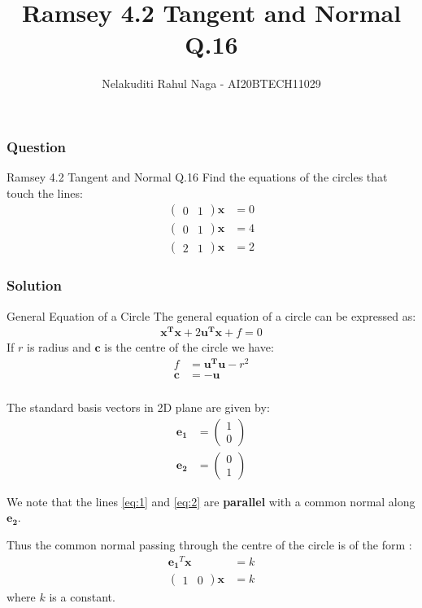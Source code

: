 \documentclass{beamer}
\title{Ramsey 4.2 Tangent and Normal Q.16}
\author{Nelakuditi Rahul Naga - AI20BTECH11029}
\newcommand{\myvec}[1]{\ensuremath{\begin{pmatrix}#1\end{pmatrix}}}
\renewcommand{\vec}[1]{\mathbf{#1}}
\begin{document}
\begin{frame}
\titlepage
\end{frame}

\begin{frame}
\frametitle{Question}
\begin{block}{Ramsey 4.2 Tangent and Normal Q.16}
Find the equations of the circles that touch the lines:
\begin{align}
\myvec{0 & 1}\vec{x} &= 0 \label{eq:1}
\\\myvec{0 & 1}\vec{x} &= 4 \label{eq:2}
\\\myvec{2 & 1}\vec{x} &= 2 \label{eq:3}
\end{align}
\end{block}
\end{frame}

\begin{frame}
\frametitle{Solution}
\begin{block}{General Equation of a Circle}
The general equation of a circle can be expressed as:
\begin{align}
\vec{x^T}\vec{x} + 2\vec{u^T}\vec{x} + f = 0 \label{eq:4}
\end{align}
If $r$ is radius and $\vec{c}$ is the centre of the circle we have:
\begin{align}
f &=\vec{u^T}\vec{u}-r^2  \label{eq:5} \\  
\vec{c} &=-\vec{u}
\end{align}
\end{block}
\end{frame}

\begin{frame}
\frametitle{}
The standard basis vectors in 2D plane are given by:
\begin{align}
\vec{e_{1}} &= \myvec{1 \\ 0}
\\\vec{e_{2}} &= \myvec{0 \\ 1}
\end{align}

We note that the lines \eqref{eq:1} and \eqref{eq:2} are \textbf{parallel} with a common normal along $\vec{e_{2}}$. 

Thus the common normal passing through the centre of the circle is of the form :
\begin{align}
\vec{e_{1}}^T\vec{x} &= k\\
\myvec{1 & 0}\vec{x}&=k 
\end{align}
where $k$ is a constant.
\end{frame}
\end{document}
